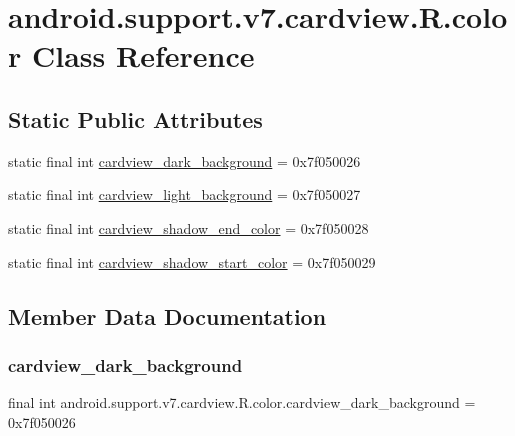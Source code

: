\hypertarget{classandroid_1_1support_1_1v7_1_1cardview_1_1R_1_1color}{}\section{android.\+support.\+v7.\+cardview.\+R.\+color Class Reference}
\label{classandroid_1_1support_1_1v7_1_1cardview_1_1R_1_1color}
\subsection*{Static Public Attributes}
\begin{DoxyCompactItemize}
\item 
static final int \mbox{\hyperlink{classandroid_1_1support_1_1v7_1_1cardview_1_1R_1_1color_af7ff826668995c4400ccadd1ef0f2d8a}{cardview\+\_\+dark\+\_\+background}} = 0x7f050026
\item 
static final int \mbox{\hyperlink{classandroid_1_1support_1_1v7_1_1cardview_1_1R_1_1color_ae659601d62aa4cbf92226f91861f190b}{cardview\+\_\+light\+\_\+background}} = 0x7f050027
\item 
static final int \mbox{\hyperlink{classandroid_1_1support_1_1v7_1_1cardview_1_1R_1_1color_a4da5f6024355095c412b04a275ede572}{cardview\+\_\+shadow\+\_\+end\+\_\+color}} = 0x7f050028
\item 
static final int \mbox{\hyperlink{classandroid_1_1support_1_1v7_1_1cardview_1_1R_1_1color_a929bef0cb9181e56c3492cdb1b379f8d}{cardview\+\_\+shadow\+\_\+start\+\_\+color}} = 0x7f050029
\end{DoxyCompactItemize}


\subsection{Member Data Documentation}
\mbox{\label{classandroid_1_1support_1_1v7_1_1cardview_1_1R_1_1color_af7ff826668995c4400ccadd1ef0f2d8a}} 
\subsubsection{\texorpdfstring{cardview\+\_\+dark\+\_\+background}{cardview\_dark\_background}}
{\footnotesize\ttfamily final int android.\+support.\+v7.\+cardview.\+R.\+color.\+cardview\+\_\+dark\+\_\+background = 0x7f050026\hspace{0.3cm}{\ttfamily [static]}}

